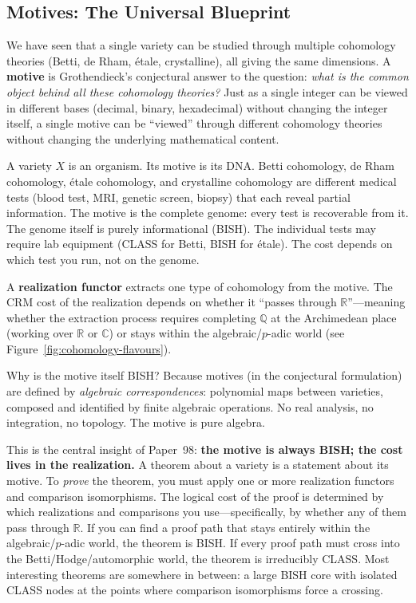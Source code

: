 \documentclass[11pt,twoside,openany]{report}
\theoremstyle{remark}
\newcommand{\BISH}{\textsf{BISH}}
\newcommand{\CLASS}{\textsf{CLASS}}
\begin{document}
\subsection*{Motives: The Universal Blueprint}

We have seen that a single variety can be studied through multiple cohomology theories (Betti, de Rham, \'etale, crystalline), all giving the same dimensions. A \textbf{motive} is Grothendieck's conjectural answer to the question: \emph{what is the common object behind all these cohomology theories?} Just as a single integer can be viewed in different bases (decimal, binary, hexadecimal) without changing the integer itself, a single motive can be ``viewed'' through different cohomology theories without changing the underlying mathematical content.

\begin{analogybox}
A variety $X$ is an organism. Its motive is its DNA. Betti cohomology, de Rham cohomology, \'etale cohomology, and crystalline cohomology are different medical tests (blood test, MRI, genetic screen, biopsy) that each reveal partial information. The motive is the complete genome: every test is recoverable from it. The genome itself is purely informational (\BISH). The individual tests may require lab equipment (\CLASS{} for Betti, \BISH{} for \'etale). The cost depends on which test you run, not on the genome.
\end{analogybox}

A \textbf{realization functor} extracts one type of cohomology from the motive. The CRM cost of the realization depends on whether it ``passes through $\mathbb{R}$''---meaning whether the extraction process requires completing $\mathbb{Q}$ at the Archimedean place (working over $\mathbb{R}$ or $\mathbb{C}$) or stays within the algebraic/$p$-adic world (see Figure~\ref{fig:cohomology-flavours}).

Why is the motive itself \BISH? Because motives (in the conjectural formulation) are defined by \emph{algebraic correspondences}: polynomial maps between varieties, composed and identified by finite algebraic operations. No real analysis, no integration, no topology. The motive is pure algebra.

This is the central insight of Paper~98: \textbf{the motive is always \BISH; the cost lives in the realization.} A theorem about a variety is a statement about its motive. To \emph{prove} the theorem, you must apply one or more realization functors and comparison isomorphisms. The logical cost of the proof is determined by which realizations and comparisons you use---specifically, by whether any of them pass through $\mathbb{R}$. If you can find a proof path that stays entirely within the algebraic/$p$-adic world, the theorem is \BISH. If every proof path must cross into the Betti/Hodge/automorphic world, the theorem is irreducibly \CLASS. Most interesting theorems are somewhere in between: a large \BISH{} core with isolated \CLASS{} nodes at the points where comparison isomorphisms force a crossing.
\end{document}
